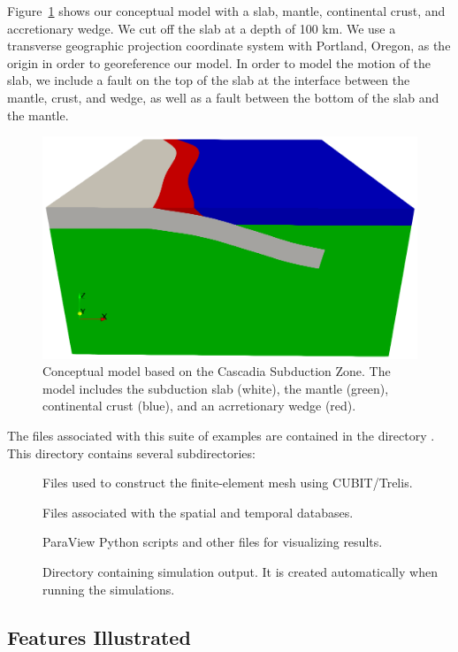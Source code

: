 Figure~\ref{fig:example:subduction:3d:concept} shows our conceptual
model with a slab, mantle, continental crust, and accretionary
wedge. We cut off the slab at a depth of 100 km. We use a transverse
geographic projection coordinate system with Portland, Oregon, as the
origin in order to georeference our model. In order to model the
motion of the slab, we include a fault on the top of the slab at the
interface between the mantle, crust, and wedge, as well as a fault
between the bottom of the slab and the mantle.

\begin{figure}[htbp]
  \includegraphics[width=4.5in]{examples/figs/subduction3d_conceptualmodel}
  \caption{Conceptual model based on the Cascadia Subduction Zone. The
    model includes the subduction slab (white), the mantle (green),
    continental crust (blue), and an acrretionary wedge (red).}
  \label{fig:example:subduction:3d:concept}
\end{figure}

The files associated with this suite of examples are contained in the
directory . This directory contains
several subdirectories:
\begin{description}
\item[] Files used to construct the finite-element mesh using
  CUBIT/Trelis.
\item[] Files associated with the spatial
  and temporal databases.
\item[] ParaView
  Python scripts and other files for visualizing results.
\item[] Directory containing simulation
  output. It is created automatically when running the
  simulations.
\end{description}


\subsection{Features Illustrated}

